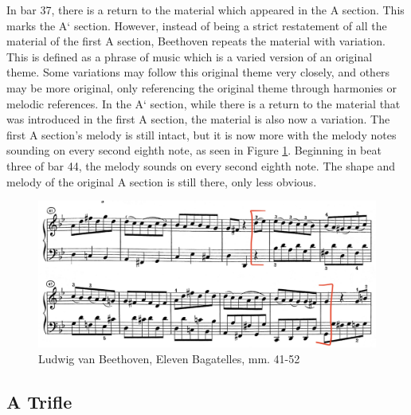 In bar 37, there is a return to the material which appeared in the A section. This marks the A` section. However, instead of being a strict restatement of all the material of the first A section, Beethoven repeats the material with variation. This is defined as a phrase of music which is a varied version of an original theme. Some variations may follow this original theme very closely, and others may be more original, only referencing the original theme through harmonies or melodic references.\autocite{Kennedy_Kennedy_Rutherford-Johnson_2013b} In the A` section, while there is a return to the material that was introduced in the first A section, the material is also now a variation. The first A section's melody is still intact, but it is now more  with the melody notes sounding on every second eighth note, as seen in Figure \ref{fig:beethoven-a-prime-melody-variation}\autocite{Henle_1978}. Beginning in beat three of bar 44, the melody sounds on every second eighth note. The shape and melody of the original A section is still there, only less obvious.

\begin{figure}[h]
	\centering
	\includegraphics[width=\textwidth]{figures/beethoven-a-prime-melody-variation}
	\caption{Ludwig van Beethoven, Eleven Bagatelles, mm. 41-52}
	\label{fig:beethoven-a-prime-melody-variation}
\end{figure}

\subsection{A Trifle}

